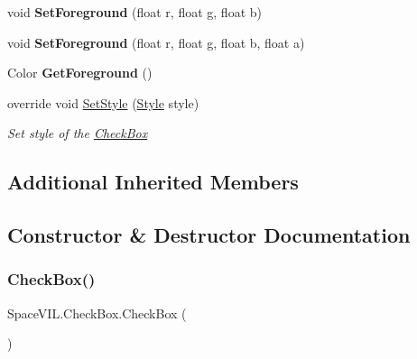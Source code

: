 \begin{DoxyCompactItemize}
\item 
\mbox{\label{class_space_v_i_l_1_1_check_box_a862fafe76738b5c9c9430d24dd833e7b}} 
void {\bfseries Set\+Foreground} (float r, float g, float b)
\item 
\mbox{\label{class_space_v_i_l_1_1_check_box_a089c161c0b2fa6d042ecb4d2bf791a29}} 
void {\bfseries Set\+Foreground} (float r, float g, float b, float a)
\item 
\mbox{\label{class_space_v_i_l_1_1_check_box_a7b4c78bb81dd8ace000705afe14bacdc}} 
Color {\bfseries Get\+Foreground} ()
\item 
override void \mbox{\hyperlink{class_space_v_i_l_1_1_check_box_a123c8ba848fb10601c5ee80681410f23}{Set\+Style}} (\mbox{\hyperlink{class_space_v_i_l_1_1_decorations_1_1_style}{Style}} style)
\begin{DoxyCompactList}\small\item\em Set style of the \mbox{\hyperlink{class_space_v_i_l_1_1_check_box}{Check\+Box}} \end{DoxyCompactList}\end{DoxyCompactItemize}
\subsection*{Additional Inherited Members}


\subsection{Constructor \& Destructor Documentation}
\mbox{\label{class_space_v_i_l_1_1_check_box_ac4cc39e7a28c54aa260902b2d742e0e8}} 
\subsubsection{\texorpdfstring{Check\+Box()}{CheckBox()}}
{\footnotesize\ttfamily Space\+V\+I\+L.\+Check\+Box.\+Check\+Box (\begin{DoxyParamCaption}{ }\end{DoxyParamCaption})}



